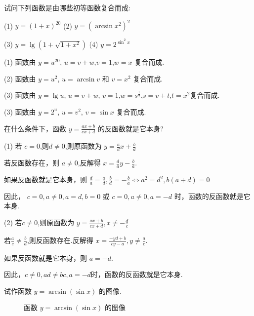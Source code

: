 \begin{practice}
    试问下列函数是由哪些初等函数复合而成:
    
(1) $y=(1+x)^{20}$ \quad (2) $y=(\arcsin x^2)^2$

(3) $y=\lg (1+\sqrt{1+x^2})$ \quad (4) $y=2^{\sin^2 x}$
\end{practice}

\begin{solve}
    (1) 函数由 $y=u^{20}$, $u=v+w$,$v=1$,$w=x$ 复合而成.

    (2) 函数由 $y=u^{2}$, $u=\arcsin v$ 和 $v=x^2$ 复合而成.

    (3) 函数由 $y=\lg u$, $u=v+w$, 
    $v=1$,$w=s^{\frac{1}{2}}$,$s=v+t$,$t=x^2$复合而成.

    (3) 函数由 $y=2^u$, $u=v^2$, 
    $v=\sin x$ 复合而成.
\end{solve}

\begin{practice}
    在什么条件下，函数 $y=\frac{ax+b}{cx+d}$ 的反函数就是它本身?
\end{practice}

\begin{solve}
(1) 若 $c=0$,则$d\ne 0$,则原函数为 $y=\frac{a}{d}x+\frac{b}{d}$

若反函数存在，则 $a\ne 0$,反解得 $x=\frac{d}{a}y-\frac{b}{a}$.

如果反函数就是它本身，则 $\frac{d}{a}=\frac{a}{d},\frac{b}{d}=-\frac{b}{a}\iff a^2=d^2,b(a+d)=0$

因此， $c=0,a\ne 0,a=d,b=0$ 或 $c=0,a\ne 0,a=-d$ 时，函数的反函数就是它本身.

(2) 若$c\ne 0$,则原函数为 $y=\frac{ax+b}{cx+d},x\ne -\frac{d}{c}$

    若$\frac{a}{c}\ne \frac{b}{d}$,则反函数存在.反解得 $x=\frac{-yd+b}{cy-a},y\ne \frac{a}{c}$.

如果反函数就是它本身，则 $a=-d$.

因此，$
c\ne 0,ad\ne bc,a=-d$时，函数的反函数就是它本身.
\end{solve}

\begin{practice}
    试作函数 $y=\arcsin(\sin x)$ 的图像.
\end{practice}

\begin{figure}[htbp]
    \centering
    \caption{函数 $y=\arcsin(\sin x)$ 的图像}
    \label{fig:arcsin}
\end{figure}

